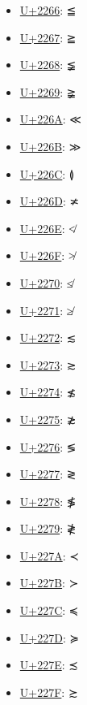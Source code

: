 \begin{itemize}
	\item \href{https://decodeunicode.org/en/u+2266}{U+2266}: ≦
	\item \href{https://decodeunicode.org/en/u+2267}{U+2267}: ≧
	\item \href{https://decodeunicode.org/en/u+2268}{U+2268}: ≨
	\item \href{https://decodeunicode.org/en/u+2269}{U+2269}: ≩
	\item \href{https://decodeunicode.org/en/u+226A}{U+226A}: ≪
	\item \href{https://decodeunicode.org/en/u+226B}{U+226B}: ≫
	\item \href{https://decodeunicode.org/en/u+226C}{U+226C}: ≬
	\item \href{https://decodeunicode.org/en/u+226D}{U+226D}: ≭
	\item \href{https://decodeunicode.org/en/u+226E}{U+226E}: ≮
	\item \href{https://decodeunicode.org/en/u+226F}{U+226F}: ≯
	\item \href{https://decodeunicode.org/en/u+2270}{U+2270}: ≰
	\item \href{https://decodeunicode.org/en/u+2271}{U+2271}: ≱
	\item \href{https://decodeunicode.org/en/u+2272}{U+2272}: ≲
	\item \href{https://decodeunicode.org/en/u+2273}{U+2273}: ≳
	\item \href{https://decodeunicode.org/en/u+2274}{U+2274}: ≴
	\item \href{https://decodeunicode.org/en/u+2275}{U+2275}: ≵
	\item \href{https://decodeunicode.org/en/u+2276}{U+2276}: ≶
	\item \href{https://decodeunicode.org/en/u+2277}{U+2277}: ≷
	\item \href{https://decodeunicode.org/en/u+2278}{U+2278}: ≸
	\item \href{https://decodeunicode.org/en/u+2279}{U+2279}: ≹
	\item \href{https://decodeunicode.org/en/u+227A}{U+227A}: ≺
	\item \href{https://decodeunicode.org/en/u+227B}{U+227B}: ≻
	\item \href{https://decodeunicode.org/en/u+227C}{U+227C}: ≼
	\item \href{https://decodeunicode.org/en/u+227D}{U+227D}: ≽
	\item \href{https://decodeunicode.org/en/u+227E}{U+227E}: ≾
	\item \href{https://decodeunicode.org/en/u+227F}{U+227F}: ≿

\end{itemize}
